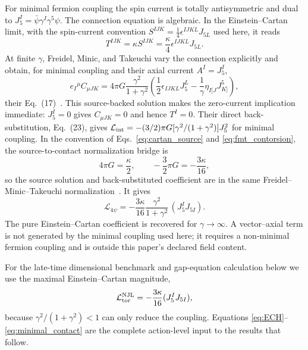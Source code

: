 \documentclass[aps,prd,twocolumn,superscriptaddress,preprintnumbers,nofootinbib,longbibliography,floatfix]{revtex4-2}
\begin{document}
For minimal fermion coupling the spin current is totally antisymmetric and
dual to $J_5^I=\bar\psi\gamma^I\gamma^5\psi$.  The connection equation is
algebraic.  In the Einstein--Cartan limit, with the spin-current convention
$S^{IJK}=\tfrac14\epsilon^{IJKL}J_{5L}$ used here, it reads
\begin{equation}\label{eq:torsion}
T^{IJK}=\kappa S^{IJK}=\frac{\kappa}{4}\epsilon^{IJKL}J_{5L}.
\end{equation}
At finite $\gamma$, Freidel, Minic, and Takeuchi vary the connection explicitly
and obtain, for minimal coupling and their axial current $A^I=J_5^I$,
\begin{equation}\label{eq:fmt_contorsion}
e_I{}^\mu C_{\mu JK}=4\pi G\frac{\gamma^2}{1+\gamma^2}
\left(\frac12\epsilon_{IJKL}J_5^L
-\frac1\gamma\eta_{I[J}J^5_{K]}\right),
\end{equation}
their Eq.~(17)~\cite{Freidel2005}.  This source-backed solution makes the
zero-current implication immediate: $J_5^I=0$ gives $C_{\mu JK}=0$ and hence
$T^I=0$.  Their direct back-substitution, Eq.~(23), gives
$\mathcal L_{\rm int}=-(3/2)\pi G[\gamma^2/(1+\gamma^2)]J_5^2$ for minimal
coupling.  In the convention of Eqs.~\eqref{eq:cartan_source} and
\eqref{eq:fmt_contorsion}, the source-to-contact normalization bridge is
\begin{equation}\label{eq:fmt_normalization_bridge}
4\pi G=\frac{\kappa}{2},\qquad
-\frac{3}{2}\pi G=-\frac{3\kappa}{16},
\end{equation}
so the source solution and back-substituted coefficient are in the same
Freidel--Minic--Takeuchi normalization~\cite{Freidel2005}.  It gives
\begin{equation}\label{eq:4fermi}
\mathcal L_{4\psi}=-\frac{3\kappa}{16}
\frac{\gamma^2}{1+\gamma^2}\,(J_5^I J_{5I}).
\end{equation}
The pure Einstein--Cartan coefficient is recovered for
$\gamma\rightarrow\infty$.  A vector--axial term is not generated by the
minimal coupling used here; it requires a non-minimal fermion coupling and is
outside this paper's declared field content.

For the late-time dimensional benchmark and gap-equation calculation below we use the
maximal Einstein--Cartan magnitude,
\begin{equation}\label{eq:minimal_contact}
\mathcal L^{\rm NJL}_{\rm tor}=-\frac{3\kappa}{16}(J_5^I J_{5I}),
\end{equation}
because $\gamma^2/(1+\gamma^2)<1$ can only reduce the coupling.  Equations
\eqref{eq:ECH}--\eqref{eq:minimal_contact} are the complete action-level input to
the results that follow.
\end{document}
